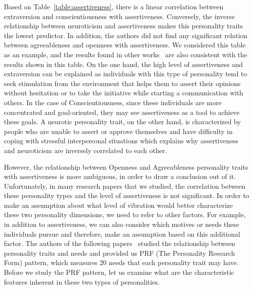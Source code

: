 Based on Table~\ref{table:assertiveness}, there is a linear correlation between
extraversion and conscientiousness with assertiveness.
Conversely, the inverse relationship between neuroticism and assertiveness
makes this personality traits the lowest predictor.
In addition, the authors did not find any significant relation between agreeableness and openness with assertiveness.
We considered this table as an example, and the results found in other
works~\cite{kirst2011investigating,ramanaiah1993neo,lefevre1981assertiveness} are
also consistent with the results shown in this table.
On the one hand, the high level of assertiveness and extraversion can be explained
as individuals with this type of personality tend to seek stimulation from the environment
that helps them to assert their opinions without hesitation or to take
the initiative while starting a communication with others.
In the case of Conscientiousness, since these individuals are more
concentrated and goal-oriented, they may see assertiveness as a tool to achieve these goals.
A neurotic personality trait, on the other hand, is characterized
by people who are unable to assert or approve themselves and have difficulty in coping with stressful
interpersonal situations which explains why assertiveness and neuroticism are inversely correlated to each other.

However, the relationship between Openness and Agreeableness personality traits with
assertiveness is more ambiguous, in order to draw a conclusion out of it.
Unfortunately, in many research papers that we studied, the correlation between these
personality types and the level of assertiveness is not significant.
In order to make an assumption about what level of vibration would better characterize
these two personality dimensions, we need to refer to other factors.
For example, in addition to assertiveness, we can also consider which motives or needs these
individuals pursue and therefore, make an assumption based on this additional factor.
The authors of the following papers~\cite{costa1988catalog} studied the relationship between
personality traits and needs and provided us PRF (The Personality Research Form) pattern,
which measures 20 needs that each personality trait may have.
Before we study the PRF pattern, let us examine what are the characteristic features
inherent in these two types of personalities.

